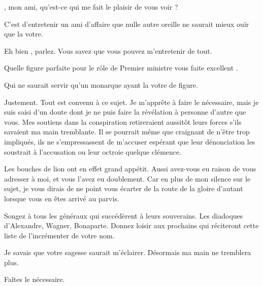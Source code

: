 \begin{drama}
  \elenaspeaks \general, mon ami, qu’est-ce qui me fait le plaisir de vous voir ?

  \generalspeaks C’est d’entretenir un ami d’affaire que nulle autre oreille ne saurait mieux ouïr que la votre.


  \exit{\alexas}

  \elenaspeaks Eh bien \general, parlez. Vous savez que vous pouvez m’entretenir de tout.

  \generalspeaks Quelle figure parfaite pour le rôle de Premier ministre vous faite excellent \elena.

  \elenaspeaks Qui ne saurait servir qu’un monarque ayant la votre de figure.

  \generalspeaks Justement. Tout est convenu à ce sujet. Je m’apprête à faire le nécessaire, mais je suis saisi d’un doute dont je ne puis faire la révélation à personne d’autre que vous. Mes soutiens dans la conspiration retireraient aussitôt leurs forces s’ils savaient ma main tremblante. Il se pourrait même que craignant de n’être trop impliqués, ils ne s’empressassent  de m’accuser espérant que leur dénonciation les soustrait à l’accusation ou leur octroie quelque clémence.

  \elenaspeaks Les bouches de lion ont en effet grand appétit. Aussi avez-vous eu raison de vous adresser à moi, et vous l’avez eu doublement. Car en plus de mon silence sur le sujet, je vous dirais de ne point vous écarter de la route de la gloire d’autant lorsque vous en êtes arrivé au parvis.

  Songez à tous les généraux qui succédèrent à leurs souverains. Les diadoques d’Alexandre, Wagner, Bonaparte. Donnez loisir aux prochains qui réciteront cette liste de l’incrémenter de votre nom.

  \generalspeaks Je savais que votre sagesse saurait m’éclairer. Désormais ma main ne tremblera plus.

  \elenaspeaks Faîtes le nécessaire.
\end{drama}

\scene

\StageDirII{\roi, \ela, \kingsgards, \general, \conspirateurs}



